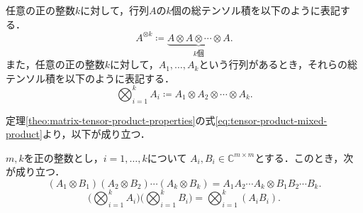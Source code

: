 \begin{defi}[テンソル積の記法]
  任意の正の整数$k$に対して，行列$A$の$k$個の総テンソル積を以下のように表記する．
  \[
    A^{\otimes k} \coloneq \underbrace{A\otimes A\otimes\cdots\otimes A}_{k\text{個}}.
  \]
  また，任意の正の整数$k$に対して，$A_1,\ldots,A_k$という行列があるとき，それらの総テンソル積を以下のように表記する．
  \[
    \bigotimes_{i=1}^k A_i \coloneq A_1\otimes A_2\otimes\cdots\otimes A_k.
  \]
\end{defi}
定理\ref{theo:matrix-tensor-product-properties}の式\eqref{eq:tensor-product-mixed-product}より，以下が成り立つ．
\begin{theo}
  $m,k$を正の整数とし，$i=1,\ldots,k$について
  $A_i,B_i\in\mathbb{C}^{m\times m}$とする．このとき，次が成り立つ．
  \begin{equation*}
    (A_1\otimes B_1)(A_2\otimes B_2)\cdots(A_k\otimes B_k)
    = A_1A_2\cdots A_k \otimes B_1B_2\cdots B_k.
  \end{equation*}
  \begin{equation*}
    \Bigg(\bigotimes_{i=1}^k A_i\Bigg) \Bigg(\bigotimes_{i=1}^k B_i\Bigg)
    =\bigotimes_{i=1}^k (A_i B_i).
  \end{equation*}
\end{theo}
